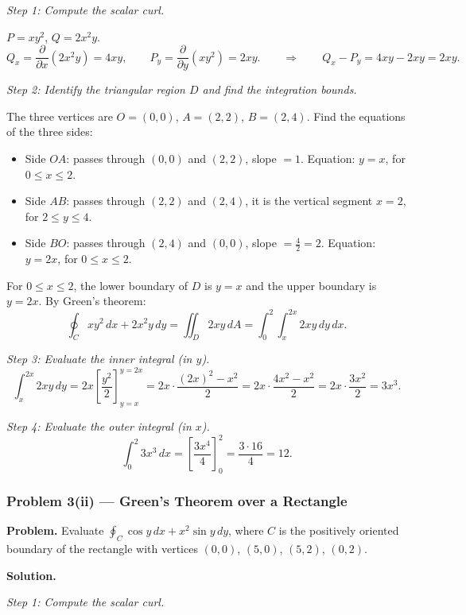 \documentclass[11pt]{article}
\begin{document}
\textit{Step 1: Compute the scalar curl.}

$P = xy^2$, $Q = 2x^2y$.
\[
  Q_x = \frac{\partial}{\partial x}(2x^2y) = 4xy,
  \qquad
  P_y = \frac{\partial}{\partial y}(xy^2) = 2xy.
  \qquad\Longrightarrow\qquad
  Q_x - P_y = 4xy - 2xy = 2xy.
\]

\textit{Step 2: Identify the triangular region $D$ and find the integration bounds.}

The three vertices are $O=(0,0)$, $A=(2,2)$, $B=(2,4)$. Find the equations of the three sides:
\begin{itemize}
  \item Side $OA$: passes through $(0,0)$ and $(2,2)$, slope $= 1$. Equation: $y = x$, for $0\le x\le 2$.
  \item Side $AB$: passes through $(2,2)$ and $(2,4)$, it is the vertical segment $x = 2$, for $2\le y\le 4$.
  \item Side $BO$: passes through $(2,4)$ and $(0,0)$, slope $= \frac{4}{2} = 2$. Equation: $y = 2x$, for $0\le x\le 2$.
\end{itemize}

For $0 \le x \le 2$, the lower boundary of $D$ is $y = x$ and the upper boundary is $y = 2x$.
By Green's theorem:
\[
  \oint_C xy^2\,dx + 2x^2y\,dy
  = \iint_D 2xy\,dA
  = \int_0^2 \int_x^{2x} 2xy\,dy\,dx.
\]

\textit{Step 3: Evaluate the inner integral (in $y$).}
\[
  \int_x^{2x} 2xy\,dy
  = 2x\left[\frac{y^2}{2}\right]_{y=x}^{y=2x}
  = 2x\cdot\frac{(2x)^2 - x^2}{2}
  = 2x\cdot\frac{4x^2 - x^2}{2}
  = 2x\cdot\frac{3x^2}{2}
  = 3x^3.
\]

\textit{Step 4: Evaluate the outer integral (in $x$).}
\[
  \int_0^2 3x^3\,dx
  = \left[\frac{3x^4}{4}\right]_0^2
  = \frac{3 \cdot 16}{4}
  = \boxed{12}.
\]

\bigskip
\subsubsection*{Problem 3(ii) --- Green's Theorem over a Rectangle}

\textbf{Problem.}
Evaluate $\displaystyle\oint_C \cos y\,dx + x^2\sin y\,dy$, where $C$ is the positively oriented boundary of the rectangle with vertices $(0,0)$, $(5,0)$, $(5,2)$, $(0,2)$.

\medskip
\textbf{Solution.}

\textit{Step 1: Compute the scalar curl.}
\end{document}
